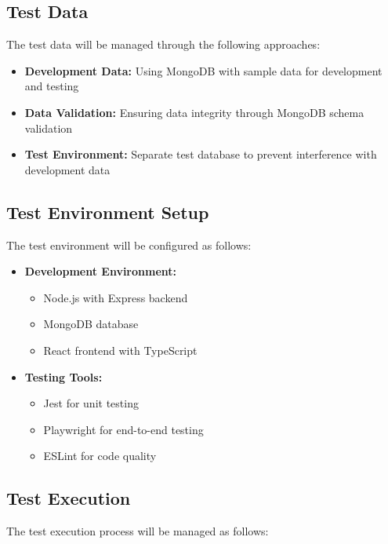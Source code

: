 \documentclass[12pt, titlepage]{article}
\begin{document}
\subsection{Test Data}
The test data will be managed through the following approaches:
\begin{itemize}
    \item \textbf{Development Data:} Using MongoDB with sample data for development and testing
    \item \textbf{Data Validation:} Ensuring data integrity through MongoDB schema validation
    \item \textbf{Test Environment:} Separate test database to prevent interference with development data
\end{itemize}

\subsection{Test Environment Setup}
The test environment will be configured as follows:
\begin{itemize}
    \item \textbf{Development Environment:}
    \begin{itemize}
        \item Node.js with Express backend
        \item MongoDB database
        \item React frontend with TypeScript
    \end{itemize}
    \item \textbf{Testing Tools:}
    \begin{itemize}
        \item Jest for unit testing
        \item Playwright for end-to-end testing
        \item ESLint for code quality
    \end{itemize}
\end{itemize}

\subsection{Test Execution}
The test execution process will be managed as follows:
\end{document}
